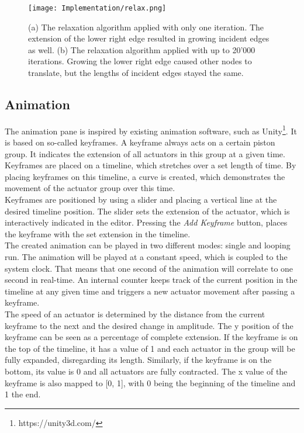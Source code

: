 \begin{figure}[ht!]
    \texttt{[image: Implementation/relax.png]}
    \centering
    \caption{(a) The relaxation algorithm applied with only one iteration. The extension of the lower right edge resulted in growing incident edges as well. (b) The relaxation algorithm applied with up to 20'000 iterations. Growing the lower right edge caused other nodes to translate, but the lengths of incident edges stayed the same.}
    \label{fig:relax}
\end{figure}

\subsection{Animation}
The animation pane is inspired by existing animation software, such as Unity\footnote{https://unity3d.com/}. It is based on so-called keyframes. A keyframe always acts on a certain piston group. It indicates the extension of all actuators in this group at a given time. Keyframes are placed on a timeline, which stretches over a set length of time. By placing keyframes on this timeline, a curve is created, which demonstrates the movement of the actuator group over this time.\\
Keyframes are positioned by using a slider and placing a vertical line at the desired timeline position. The slider sets the extension of the actuator, which is interactively indicated in the editor. Pressing the \textit{Add Keyframe} button, places the keyframe with the set extension in the timeline.\\
The created animation can be played in two different modes: single and looping run. The animation will be played at a constant speed, which is coupled to the system clock. That means that one second of the animation will correlate to one second in real-time. An internal counter keeps track of the current position in the timeline at any given time and triggers a new actuator movement after passing a keyframe.\\
The speed of an actuator is determined by the distance from the current keyframe to the next and the desired change in amplitude. The y position of the keyframe can be seen as a percentage of complete extension. If the keyframe is on the top of the timeline, it has a value of 1 and each actuator in the group will be fully expanded, disregarding its length. Similarly, if the keyframe is on the bottom, its value is 0 and all actuators are fully contracted. The x value of the keyframe is also mapped to [0, 1], with 0 being the beginning of the timeline and 1 the end.\\
